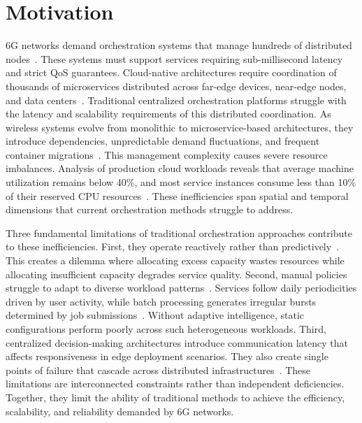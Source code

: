 \section{Motivation}
\label{sec:ch1_motivation}

\ac{6G} networks demand orchestration systems that manage hundreds of distributed nodes~\cite{6g_roaming, intent_driven_ran2021}. These systems must support services requiring sub-millisecond latency and strict \ac{QoS} guarantees. Cloud-native architectures require coordination of thousands of microservices distributed across far-edge devices, near-edge nodes, and data centers~\cite{6g_struggles_orchestration2025}. Traditional centralized orchestration platforms struggle with the latency and scalability requirements of this distributed coordination. As wireless systems evolve from monolithic to microservice-based architectures, they introduce dependencies, unpredictable demand fluctuations, and frequent container migrations~\cite{10029931, ouyang2023dynamic}. This management complexity causes severe resource imbalances. Analysis of production cloud workloads reveals that average machine utilization remains below 40\%, and most service instances consume less than 10\% of their reserved \ac{CPU} resources~\cite{8258257}. These inefficiencies span spatial and temporal dimensions that current orchestration methods struggle to address.

Three fundamental limitations of traditional orchestration approaches contribute to these inefficiencies. First, they operate reactively rather than predictively~\cite{aloqaily2023metaverse}. This creates a dilemma where allocating excess capacity wastes resources while allocating insufficient capacity degrades service quality. Second, manual policies struggle to adapt to diverse workload patterns~\cite{chen2018auto}. Services follow daily periodicities driven by user activity, while batch processing generates irregular bursts determined by job submissions~\cite{calzarossa2016workload}. Without adaptive intelligence, static configurations perform poorly across such heterogeneous workloads. Third, centralized decision-making architectures introduce communication latency that affects responsiveness in edge deployment scenarios. They also create single points of failure that cascade across distributed infrastructures~\cite{6g_struggles_orchestration2025}. These limitations are interconnected constraints rather than independent deficiencies. Together, they limit the ability of traditional methods to achieve the efficiency, scalability, and reliability demanded by \ac{6G} networks.

